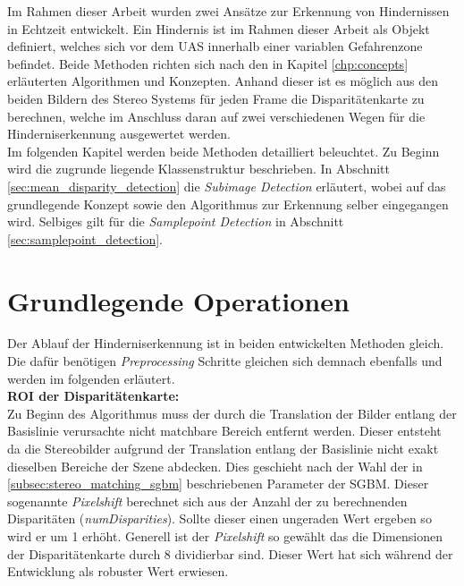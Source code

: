 Im Rahmen dieser Arbeit wurden zwei Ansätze zur Erkennung von Hindernissen in Echtzeit entwickelt. Ein Hindernis ist im Rahmen dieser Arbeit als Objekt definiert, welches sich vor dem UAS innerhalb einer variablen Gefahrenzone befindet. Beide Methoden richten sich nach den in Kapitel \ref{chp:concepts} erläuterten Algorithmen und Konzepten. Anhand dieser ist es möglich aus den beiden Bildern des Stereo Systems für jeden Frame die Disparitätenkarte zu berechnen, welche im Anschluss daran auf zwei verschiedenen Wegen für die Hinderniserkennung ausgewertet werden.\\

\noindent
Im folgenden Kapitel werden beide Methoden detailliert beleuchtet. Zu Beginn wird die zugrunde liegende Klassenstruktur beschrieben. In Abschnitt \ref{sec:mean_disparity_detection} die \emph{Subimage Detection} erläutert, wobei auf das grundlegende Konzept sowie den Algorithmus zur Erkennung selber eingegangen wird. Selbiges gilt für die \emph{Samplepoint Detection} in Abschnitt \ref{sec:samplepoint_detection}.

\section{Grundlegende Operationen}
\label{sec:preprocessing}
Der Ablauf der Hinderniserkennung ist in beiden entwickelten Methoden gleich. Die dafür benötigen \emph{Preprocessing} Schritte gleichen sich demnach ebenfalls und werden im folgenden erläutert.\\

\noindent
\textbf{ROI der Disparitätenkarte:}\\
Zu Beginn des Algorithmus muss der durch die Translation der Bilder entlang der Basislinie verursachte nicht matchbare Bereich entfernt werden. Dieser entsteht da die Stereobilder aufgrund der Translation entlang der Basislinie nicht exakt dieselben Bereiche der Szene abdecken. Dies geschieht nach der Wahl der in \ref{subsec:stereo_matching_sgbm} beschriebenen Parameter der SGBM. Dieser sogenannte \emph{Pixelshift} berechnet sich aus der Anzahl der zu berechnenden Disparitäten (\emph{numDisparities}). Sollte dieser einen ungeraden Wert ergeben so wird er um 1 erhöht. Generell ist der \emph{Pixelshift} so gewählt das die Dimensionen der Disparitätenkarte durch 8 dividierbar sind. Dieser Wert hat sich während der Entwicklung als robuster Wert erwiesen.\\

